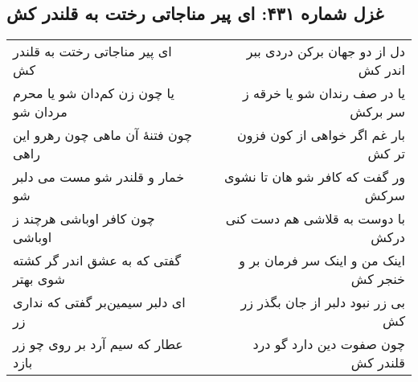 \begin{center}
\section*{غزل شماره ۴۳۱: ای پیر مناجاتی رختت به قلندر کش}
\label{sec:431}
\begin{longtable}{l p{0.5cm} r}
ای پیر مناجاتی رختت به قلندر کش
&&
دل از دو جهان برکن دردی ببر اندر کش
\\
یا چون زن کم‌دان شو یا محرم مردان شو
&&
یا در صف رندان شو یا خرقه ز سر برکش
\\
چون فتنهٔ آن ماهی چون رهرو این راهی
&&
بار غم اگر خواهی از کون فزون تر کش
\\
خمار و قلندر شو مست می دلبر شو
&&
ور گفت که کافر شو هان تا نشوی سرکش
\\
چون کافر اوباشی هرچند ز اوباشی
&&
با دوست به قلاشی هم دست کنی درکش
\\
گفتی که به عشق اندر گر کشته شوی بهتر
&&
اینک من و اینک سر فرمان بر و خنجر کش
\\
ای دلبر سیمین‌بر گفتی که نداری زر
&&
بی زر نبود دلبر از جان بگذر زر کش
\\
عطار که سیم آرد بر روی چو زر بازد
&&
چون صفوت دین دارد گو درد قلندر کش
\\
\end{longtable}
\end{center}
